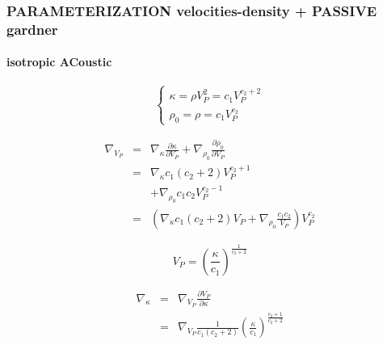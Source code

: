 \documentclass[9pt]{beamer}
\newcommand{\partderi}[2]{\frac{\partial#1}{\partial#2}}
\begin{document}
\begin{frame}\frametitle{PARAMETERIZATION velocities-density + PASSIVE gardner}
\framesubtitle{isotropic ACoustic}

  \begin{center}
  \end{center}

  \begin{minipage}{0.5\linewidth}
    \[\left\{ \begin{array}{l}
      \kappa = \rho V_P^2 = c_1 V_P^{c_2+2} \\
      \rho_0 = \rho = c_1 V_P ^{c_2}
    \end{array} \right.\]
    
    \begin{eqnarray}
      \nabla_{V_P} &=& \nabla_{\kappa} \partderi{\kappa}{V_P} + \nabla_{\rho_0} \partderi{\rho_0}{V_P} \nonumber\\
                   &=& \nabla_{\kappa} c_1(c_2+2) V_P^{c_2+1} \nonumber\\
                   & &+\nabla_{\rho_0} c_1 c_2 V_P^{c_2-1} \nonumber\\
                   &=& \left( \nabla_{\kappa} c_1(c_2+2) V_P + \nabla_{\rho_0} \frac{c_1 c_2}{V_P} \right) V_P^{c_2} \nonumber
    \end{eqnarray}

  \end{minipage} \vline
  \begin{minipage}{0.45\linewidth}
    \[ V_P = \left(\frac{\kappa}{c_1}\right)^{\frac{1}{c_2+2}} \]
    
    \begin{eqnarray}
      \nabla_{\kappa} &=& \nabla_{V_P} \partderi{V_P}{\kappa} \nonumber\\
                      &=& \nabla_{V_P} \frac{1}{c_1(c_2+2)} \left(\frac{\kappa}{c_1}\right)^{\frac{c_2+1}{c_2+2}} \nonumber
    \end{eqnarray}
  \end{minipage}

\end{frame}
\end{document}
